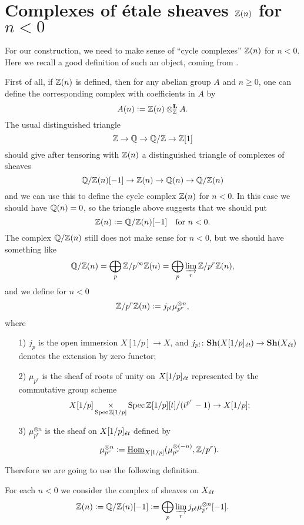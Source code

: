 \section{Complexes of étale sheaves $\mathbb{Z} (n)$ for $n < 0$}
\label{section:cycle-complex-for-negative-n}

For our construction, we need to make sense of ``cycle complexes'' $\mathbb{Z} (n)$ for
$n < 0$. Here we recall a good definition of such an object, coming from
\cite[\S 6.2]{Flach-Morin-16}.

First of all, if $\mathbb{Z} (n)$ is defined, then for any abelian group $A$ and
$n \ge 0$, one can define the corresponding complex with coefficients in $A$ by
$$A (n) \mathrel{\mathop:}= \mathbb{Z} (n) \otimes^\mathbf{L}_{\mathbb{Z}} A.$$
The usual distinguished triangle
$$\mathbb{Z} \to \mathbb{Q} \to \mathbb{Q}/\mathbb{Z} \to \mathbb{Z} [1]$$
should give after tensoring with $\mathbb{Z} (n)$ a distinguished triangle of complexes
of sheaves
$$\mathbb{Q}/\mathbb{Z} (n) [-1] \to \mathbb{Z} (n) \to \mathbb{Q} (n) \to \mathbb{Q}/\mathbb{Z}(n)$$
and we can use this to define the cycle complex $\mathbb{Z} (n)$ for $n < 0$. In this
case we should have $\mathbb{Q} (n) = 0$, so the triangle above suggests that we should
put
$$\mathbb{Z} (n) \mathrel{\mathop:}= \mathbb{Q}/\mathbb{Z} (n) [-1] \quad \text{for } n < 0.$$
The complex $\mathbb{Q}/\mathbb{Z} (n)$ still does not make sense for $n < 0$, but we should
have something like
$$\mathbb{Q}/\mathbb{Z} (n) =
  \bigoplus_p \mathbb{Z}/p^\infty \mathbb{Z} (n) =
  \bigoplus_p \varinjlim_r \mathbb{Z}/p^r \mathbb{Z} (n),$$
and we define for $n < 0$
$$\mathbb{Z}/p^r \mathbb{Z} (n) \mathrel{\mathop:}= j_{p!} \mu_{p^r}^{\otimes n},$$
where

\pagebreak

\begin{enumerate}
\item[1)] $j_p$ is the open immersion $X [1/p] \to X$, and
  $j_{p!}\colon \text{\bf Sh} (X [1/p]_\text{\it ét}) \to \text{\bf Sh} (X_\text{\it ét})$
  denotes the extension by zero functor;

\item[2)] $\mu_{p^r}$ is the sheaf of roots of unity on $X [1/p]_\text{\it ét}$
  represented by the commutative group scheme
  $$X [1/p]\mathop{\times}\limits_{\operatorname{Spec} \mathbb{Z} [1/p]} \operatorname{Spec} \mathbb{Z} [1/p] [t] / (t^{p^r}-1) \to X [1/p];$$

\item[3)] $\mu_{p^r}^{\otimes n}$ is the sheaf on $X [1/p]_\text{\it ét}$
  defined by
  $$\mu_{p^r}^{\otimes n} \mathrel{\mathop:}= \underline{\operatorname{Hom}}_{X[1/p]} (\mu_{p^r}^{\otimes (-n)}, \mathbb{Z}/p^r).$$
\end{enumerate}

Therefore we are going to use the following definition.

\begin{definition}
  For each $n < 0$ we consider the complex of sheaves on $X_\text{\it ét}$
  \[ \mathbb{Z} (n) \mathrel{\mathop:}= \mathbb{Q}/\mathbb{Z} (n) [-1] \mathrel{\mathop:}=
    \bigoplus_p \varinjlim_r  j_{p!} \mu_{p^r}^{\otimes n} [-1]. \]
\end{definition}

